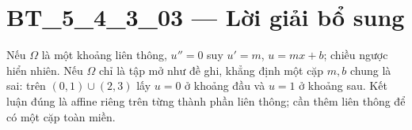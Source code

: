 \documentclass[10pt,a4paper]{article}
\begin{document}
\section*{BT\_5\_4\_3\_03 — Lời giải bổ sung}
Nếu $\Omega$ là một khoảng liên thông, $u''=0$ suy $u'=m$, $u=mx+b$; chiều ngược hiển nhiên. Nếu $\Omega$ chỉ là tập mở như đề ghi, khẳng định một cặp $m,b$ chung là sai: trên $(0,1)\cup(2,3)$ lấy $u=0$ ở khoảng đầu và $u=1$ ở khoảng sau. Kết luận đúng là affine riêng trên từng thành phần liên thông; cần thêm liên thông để có một cặp toàn miền.
\end{document}
